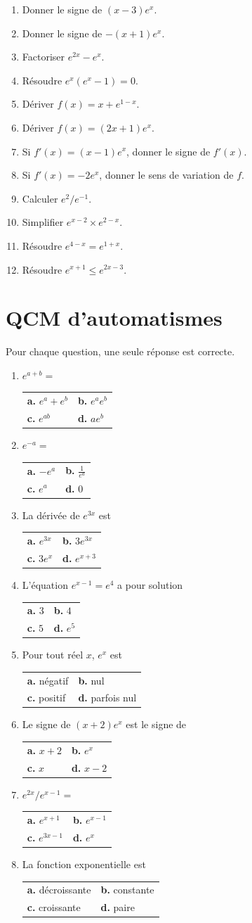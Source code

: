\documentclass[11pt,a4paper]{article}
\makeatletter
\newcounter{question}
\newenvironment{blocquestions}[1]{%
  \begin{tcolorbox}[enhanced,breakable,colback=bleuclair,colframe=bleufonce,boxrule=0.6pt,arc=2mm,left=2mm,right=2mm,top=2mm,bottom=1.5mm,title={\bfseries #1},coltitle=white,colbacktitle=bleufonce,before skip=3mm,after skip=3mm, fontupper=\large]
  \large
  \begin{enumerate}[leftmargin=*,label=\textbf{\arabic*.},itemsep=0.82em,topsep=0.5em]
  \setcounter{enumi}{\value{question}}
}{%
  \setcounter{question}{\value{enumi}}
  \end{enumerate}
  \end{tcolorbox}
}
\newcommand{\qcm}[4]{%
\begin{center}\begin{tabularx}{0.96\linewidth}{@{}XX@{}}
\textbf{a.} #1 & \textbf{b.} #2\\[1mm]
\textbf{c.} #3 & \textbf{d.} #4
\end{tabularx}\end{center}}
\makeatother
\begin{document}
\begin{blocquestions}{Questions flash 25 à 36}
\item Donner le signe de $(x-3)e^x$.
\item Donner le signe de $-(x+1)e^x$.
\item Factoriser $e^{2x}-e^x$.
\item Résoudre $e^x(e^x-1)=0$.
\item Dériver $f(x)=x+e^{1-x}$.
\item Dériver $f(x)=(2x+1)e^x$.
\item Si $f'(x)=(x-1)e^x$, donner le signe de $f'(x)$.
\item Si $f'(x)=-2e^{x}$, donner le sens de variation de $f$.
\item Calculer $e^2/e^{-1}$.
\item Simplifier $e^{x-2}\times e^{2-x}$.
\item Résoudre $e^{4-x}=e^{1+x}$.
\item Résoudre $e^{x+1}\le e^{2x-3}$.
\end{blocquestions}


\section{QCM d'automatismes}
Pour chaque question, une seule réponse est correcte.
\begin{enumerate}
\item $e^{a+b}=$\par\vspace{0.8mm}\qcm{$e^a+e^b$}{$e^ae^b$}{$e^{ab}$}{$a e^b$}
\item $e^{-a}=$\par\vspace{0.8mm}\qcm{$-e^a$}{$\frac1{e^a}$}{$e^a$}{$0$}
\item La dérivée de $e^{3x}$ est\par\vspace{0.8mm}\qcm{$e^{3x}$}{$3e^{3x}$}{$3e^x$}{$e^{x+3}$}
\item L'équation $e^{x-1}=e^4$ a pour solution\par\vspace{0.8mm}\qcm{$3$}{$4$}{$5$}{$e^5$}
\item Pour tout réel $x$, $e^x$ est\par\vspace{0.8mm}\qcm{négatif}{nul}{positif}{parfois nul}
\item Le signe de $(x+2)e^x$ est le signe de\par\vspace{0.8mm}\qcm{$x+2$}{$e^x$}{$x$}{$x-2$}
\item $e^{2x}/e^{x-1}=$\par\vspace{0.8mm}\qcm{$e^{x+1}$}{$e^{x-1}$}{$e^{3x-1}$}{$e^{x}$}
\item La fonction exponentielle est\par\vspace{0.8mm}\qcm{décroissante}{constante}{croissante}{paire}
\end{enumerate}
\end{document}
